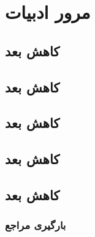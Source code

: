 \chapter{مرور ادبیات}
\section{کاهش بعد}
\section{کاهش بعد}
\section{کاهش بعد}
\section{کاهش بعد}

\section{کاهش بعد}
\subsection{بارگیری مراجع}

